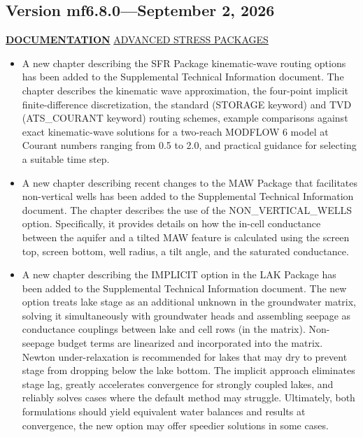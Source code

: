 \subsection{Version mf6.8.0---September 2, 2026}

\textbf{\underline{DOCUMENTATION}}
\underline{ADVANCED STRESS PACKAGES}
\begin{itemize}
\item A new chapter describing the SFR Package kinematic-wave routing options has been added to the Supplemental Technical Information document. The chapter describes the kinematic wave approximation, the four-point implicit finite-difference discretization, the standard (STORAGE keyword) and TVD (ATS\_COURANT keyword) routing schemes, example comparisons against exact kinematic-wave solutions for a two-reach MODFLOW 6 model at Courant numbers ranging from 0.5 to 2.0, and practical guidance for selecting a suitable time step.
\item A new chapter describing recent changes to the MAW Package that facilitates non-vertical wells has been added to the Supplemental Technical Information document.  The chapter describes the use of the NON\_VERTICAL\_WELLS option.  Specifically, it provides details on how the in-cell conductance between the aquifer and a tilted MAW feature is calculated using the screen top, screen bottom, well radius, a tilt angle, and the saturated conductance.
\item A new chapter describing the IMPLICIT option in the LAK Package has been added to the Supplemental Technical Information document.  The new option treats lake stage as an additional unknown in the groundwater matrix, solving it simultaneously with groundwater heads and assembling seepage as conductance couplings between lake and cell rows (in the matrix). Non-seepage budget terms are linearized and incorporated into the matrix. Newton under-relaxation is recommended for lakes that may dry to prevent stage from dropping below the lake bottom. The implicit approach eliminates stage lag, greatly accelerates convergence for strongly coupled lakes, and reliably solves cases where the default method may struggle. Ultimately, both formulations should yield equivalent water balances and results at convergence, the new option may offer speedier solutions in some cases.
\end{itemize}

